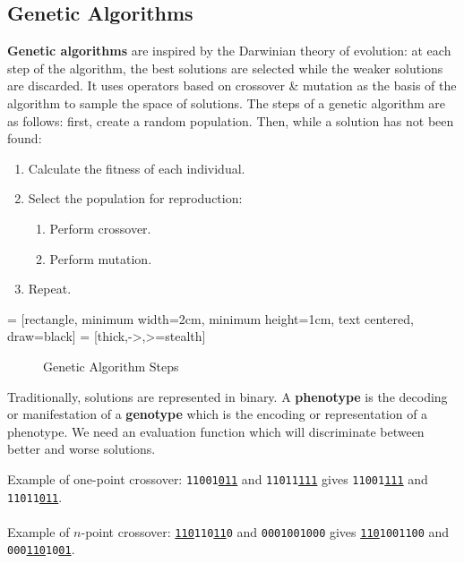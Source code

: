 \documentclass[a4paper,11pt]{article}
\begin{document}
\subsection{Genetic Algorithms}
\textbf{Genetic algorithms} are inspired by the Darwinian theory of evolution:
at each step of the algorithm, the best solutions are selected while the weaker solutions are discarded.
It uses operators based on crossover \& mutation as the basis of the algorithm to sample the space of solutions.
The steps of a genetic algorithm are as follows: first, create a random population. 
Then, while a solution has not been found:
\begin{enumerate}
    \item   Calculate the fitness of each individual.
    \item   Select the population for reproduction:
            \begin{enumerate}[label=\roman*.]
                \item   Perform crossover.
                \item   Perform mutation.
            \end{enumerate}
    \item   Repeat.
\end{enumerate}

 = [rectangle, minimum width=2cm, minimum height=1cm, text centered, draw=black]
 = [thick,->,>=stealth]

\begin{figure}[H]
    \centering
    \caption{Genetic Algorithm Steps}
\end{figure}

Traditionally, solutions are represented in binary.
A \textbf{phenotype} is the decoding or manifestation of a \textbf{genotype} which is the encoding or representation of a phenotype.
We need an evaluation function which will discriminate between better and worse solutions.
\begin{tcolorbox}[colback=gray!10, colframe=black, title=\textbf{Crossover Examples}]
Example  of one-point crossover:
\texttt{11001\underline{011}} and \texttt{11011\underline{111}} gives \texttt{11001\underline{111}} and \texttt{11011\underline{011}}.
\\\\
Example of $n$-point crossover: \texttt{\underline{110}110\underline{11}0} and \texttt{0001001000} gives \texttt{\underline{110}100\texttt{11}00} and \texttt{000\underline{110}10\underline{01}}.
\end{tcolorbox}
\end{document}
